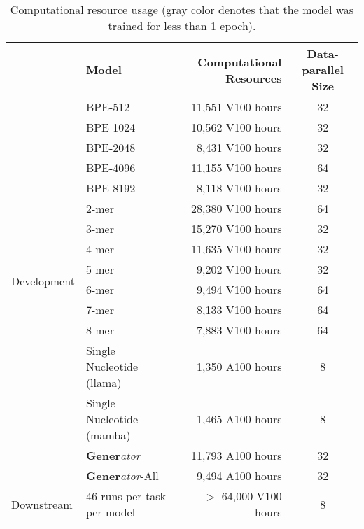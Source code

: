 \begin{table}[!htb]
\small
\renewcommand{\arraystretch}{1.2}
\centering
\caption{Computational resource usage ({\color{gray}gray color denotes that the model was trained for less than 1 epoch}).}
\begin{tabular}{llrc}
\hline
 & Model & Computational Resources & Data-parallel Size \\ \hline
\multirow{15}{*}{Development} & BPE-512 & 11,551 V100 hours & 32 \\
& BPE-1024 & 10,562 V100 hours & 32 \\
& BPE-2048 & 8,431 V100 hours & 32 \\
& BPE-4096 & 11,155 V100 hours & 64 \\
& BPE-8192 & 8,118 V100 hours & 32 \\
& 2-mer & 28,380 V100 hours & 64 \\
& 3-mer & 15,270 V100 hours & 32 \\
& 4-mer & 11,635 V100 hours & 32 \\
& 5-mer & 9,202 V100 hours & 32 \\
& 6-mer & 9,494 V100 hours & 64 \\
& 7-mer & 8,133 V100 hours & 64 \\
& 8-mer & 7,883 V100 hours & 64 \\
& {\color{gray}Single Nucleotide (llama)} & 1,350 A100 hours & 8 \\
& {\color{gray}Single Nucleotide (mamba)} & 1,465 A100 hours & 8 \\
\hline
\multirow{2}{*}{Pre-train}
& \textbf{Gener}\textit{ator} & 11,793 A100 hours & 32 \\
& \textbf{Gener}\textit{ator}-All & 9,494 A100 hours & 32 \\ \hline
Downstream & 46 runs per task per model & $>$ 64,000 V100 hours & 8 \\ \hline
\end{tabular}
\label{tab:computational_resources}
\end{table}